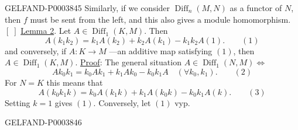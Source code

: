 \begin{GelfandAdjacentEvidence}{GELFAND-P000384}{5}
Similarly, if we consider $\operatorname{Diff}_n (M, N)$ as a functor of $N$, then $f$ must be sent from the left, and this also gives a module homomorphism.
$[\;]$ \underline{Lemma 2}. Let $A\in\operatorname{Diff}_1(K, M)$. Then
\begin{equation*}A (k_1k_2)=k_1A (k_2)+k_2A (k_1)-k_1k_2A (1).\qquad (1)\end{equation*}
and conversely, if $A: K\longrightarrow M$ ---an additive map satisfying $(1)$, then $A\in\operatorname{Diff}_1(K, M)$.
\underline{Proof}: The general situation $A\in\operatorname{Diff}_1(N, M)\Longleftrightarrow$
\begin{equation*}Ak_0k_1=k_0Ak_1+k_1Ak_0-k_0k_1A\quad (\forall k_0, k_1).\qquad (2)\end{equation*}
For $N=K$ this means that
\begin{equation*}A (k_0k_1k)=k_0A (k_1k)+k_1A (k_0k)-k_0k_1A (k).\qquad (3)\end{equation*}
Setting $k=1$ gives $(1)$. Conversely, let $(1)$ vyp.
\end{GelfandAdjacentEvidence}
\begin{GelfandAdjacentEvidence}{GELFAND-P000384}{6}




\end{GelfandAdjacentEvidence}
